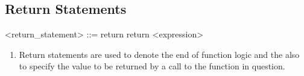 \subsection{Return Statements}
\begin{grammar}
	<return_statement> ::= return 
	\alt return <expression>
\end{grammar}
\begin{enumerate}
	\item Return statements are used to denote the end of function logic and the also to specify the value to be returned by a call to the function in question.
\end{enumerate}
